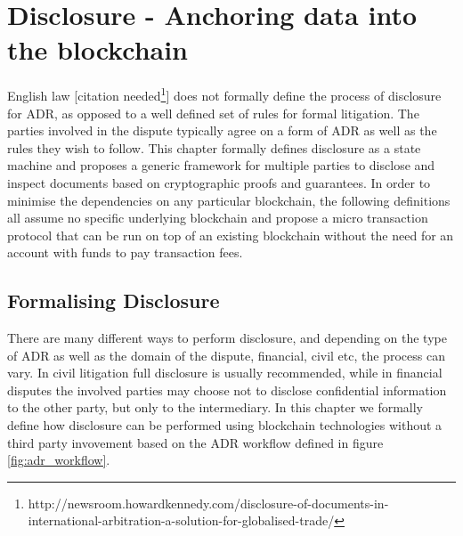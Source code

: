 \documentclass[12pt,msc,a4paper,oneside]{ucl_thesis}
\begin{document}
\chapter{Disclosure - Anchoring data into the blockchain} \label{chapter:anchoring_data_into_the_blockchain}
English law [citation needed\footnote{http://newsroom.howardkennedy.com/disclosure-of-documents-in-international-arbitration-a-solution-for-globalised-trade/}] does not formally define the process of disclosure for ADR, as opposed to a well defined set of rules for formal litigation. The parties involved in the dispute typically agree on a form of ADR as well as the rules they wish to follow. This chapter formally defines disclosure as a state machine and proposes a generic framework for multiple parties to disclose and inspect documents based on cryptographic proofs and guarantees. In order to minimise the dependencies on any particular blockchain, the following definitions all assume no specific underlying blockchain and propose a micro transaction protocol that can be run on top of an existing blockchain without the need for an account with funds to pay transaction fees.


\section{Formalising Disclosure} \label{sec:formalising_disclosure}
There are many different ways to perform disclosure, and depending on the type of ADR as well as the domain of the dispute, financial, civil etc, the process can vary. In civil litigation full disclosure is usually recommended, while in financial disputes the involved parties may choose not to disclose confidential information to the other party, but only to the intermediary. In this chapter we formally define how disclosure can be performed using blockchain technologies without a third party invovement based on the ADR workflow defined in figure \ref{fig:adr_workflow}.
\end{document}
